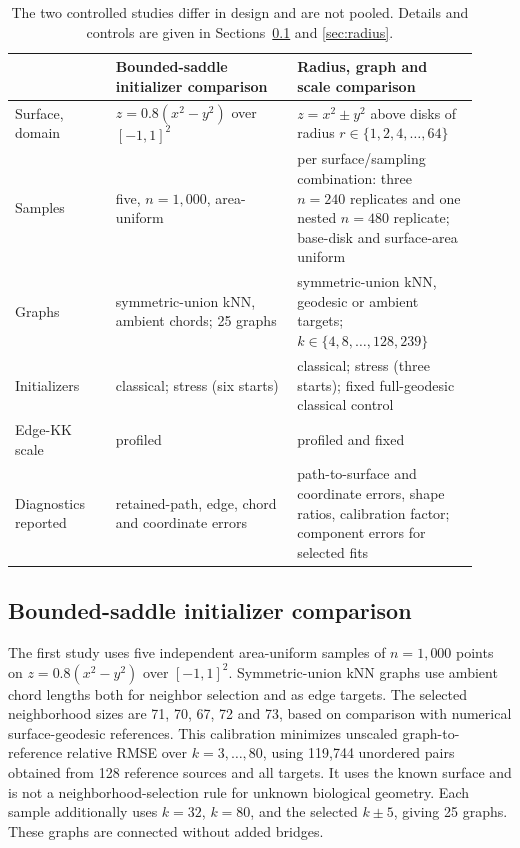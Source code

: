 \documentclass[11pt]{article}
\begin{document}
\begin{table}[tb]\centering\small
\caption{The two controlled studies differ in design and are not pooled.
Details and controls are given in Sections~\ref{sec:bounded} and
\ref{sec:radius}.}\label{tab:designs}
\begin{tabular}{@{}>{\raggedright\arraybackslash}p{0.2\linewidth}>{\raggedright\arraybackslash}p{0.36\linewidth}>{\raggedright\arraybackslash}p{0.36\linewidth}@{}}
\toprule
 & Bounded-saddle initializer comparison & Radius, graph and scale comparison\\
\midrule
Surface, domain & $z=0.8(x^2-y^2)$ over $[-1,1]^2$ & $z=x^2\pm y^2$ above disks of radius $r\in\{1,2,4,\ldots,64\}$\\\addlinespace
Samples & five, $n=1{,}000$, area-uniform & per surface/sampling combination: three $n=240$ replicates and one nested $n=480$ replicate; base-disk and surface-area uniform\\\addlinespace
Graphs & symmetric-union kNN, ambient chords; 25 graphs & symmetric-union kNN, geodesic or ambient targets; $k\in\{4,8,\ldots,128,239\}$\\\addlinespace
Initializers & classical; stress (six starts) & classical; stress (three starts); fixed full-geodesic classical control\\\addlinespace
Edge-KK scale & profiled & profiled and fixed\\\addlinespace
Diagnostics reported & retained-path, edge, chord and coordinate errors & path-to-surface and coordinate errors, shape ratios, calibration factor; component errors for selected fits\\
\bottomrule
\end{tabular}
\end{table}

\subsection{Bounded-saddle initializer comparison}\label{sec:bounded}
The first study uses five independent area-uniform samples of $n=1{,}000$
points on $z=0.8(x^2-y^2)$ over $[-1,1]^2$. Symmetric-union kNN graphs use
ambient chord lengths both for neighbor selection and as edge targets.
The selected neighborhood sizes are 71, 70, 67, 72 and 73, based on comparison
with numerical surface-geodesic references. This calibration minimizes
unscaled graph-to-reference relative RMSE over $k=3,\ldots,80$, using 119,744
unordered pairs obtained from 128 reference sources and all targets. It uses
the known surface and is not a neighborhood-selection rule for unknown
biological geometry. Each sample additionally uses
$k=32$, $k=80$, and the selected $k\pm5$, giving 25 graphs. These graphs are
connected without added bridges.
\end{document}

